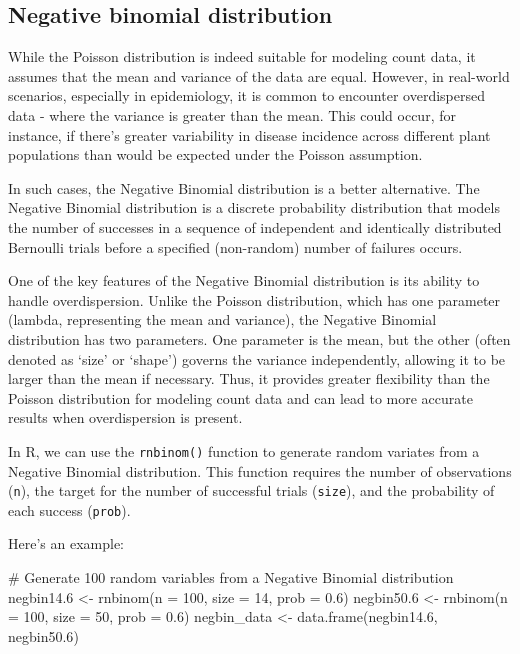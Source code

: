 \documentclass[
  letterpaper,
  DIV=11,
  numbers=noendperiod]{scrreprt}
\newenvironment{Shaded}{\begin{snugshade}}{\end{snugshade}}
\newcommand{\AttributeTok}[1]{\textcolor[rgb]{0.40,0.45,0.13}{#1}}
\newcommand{\CommentTok}[1]{\textcolor[rgb]{0.37,0.37,0.37}{#1}}
\newcommand{\DecValTok}[1]{\textcolor[rgb]{0.68,0.00,0.00}{#1}}
\newcommand{\FloatTok}[1]{\textcolor[rgb]{0.68,0.00,0.00}{#1}}
\newcommand{\FunctionTok}[1]{\textcolor[rgb]{0.28,0.35,0.67}{#1}}
\newcommand{\NormalTok}[1]{\textcolor[rgb]{0.00,0.23,0.31}{#1}}
\newcommand{\OtherTok}[1]{\textcolor[rgb]{0.00,0.23,0.31}{#1}}
\begin{document}
\hypertarget{negative-binomial-distribution}{%
\subsection{Negative binomial
distribution}\label{negative-binomial-distribution}}

While the Poisson distribution is indeed suitable for modeling count
data, it assumes that the mean and variance of the data are equal.
However, in real-world scenarios, especially in epidemiology, it is
common to encounter overdispersed data - where the variance is greater
than the mean. This could occur, for instance, if there's greater
variability in disease incidence across different plant populations than
would be expected under the Poisson assumption.

In such cases, the Negative Binomial distribution is a better
alternative. The Negative Binomial distribution is a discrete
probability distribution that models the number of successes in a
sequence of independent and identically distributed Bernoulli trials
before a specified (non-random) number of failures occurs.

One of the key features of the Negative Binomial distribution is its
ability to handle overdispersion. Unlike the Poisson distribution, which
has one parameter (lambda, representing the mean and variance), the
Negative Binomial distribution has two parameters. One parameter is the
mean, but the other (often denoted as `size' or `shape') governs the
variance independently, allowing it to be larger than the mean if
necessary. Thus, it provides greater flexibility than the Poisson
distribution for modeling count data and can lead to more accurate
results when overdispersion is present.

In R, we can use the \texttt{rnbinom()} function to generate random
variates from a Negative Binomial distribution. This function requires
the number of observations (\texttt{n}), the target for the number of
successful trials (\texttt{size}), and the probability of each success
(\texttt{prob}).

Here's an example:

\begin{Shaded}
\begin{Highlighting}[]
\CommentTok{\# Generate 100 random variables from a Negative Binomial distribution}
\NormalTok{negbin14}\FloatTok{.6} \OtherTok{\textless{}{-}} \FunctionTok{rnbinom}\NormalTok{(}\AttributeTok{n =} \DecValTok{100}\NormalTok{, }\AttributeTok{size =} \DecValTok{14}\NormalTok{, }\AttributeTok{prob =} \FloatTok{0.6}\NormalTok{)}
\NormalTok{negbin50}\FloatTok{.6} \OtherTok{\textless{}{-}} \FunctionTok{rnbinom}\NormalTok{(}\AttributeTok{n =} \DecValTok{100}\NormalTok{, }\AttributeTok{size =} \DecValTok{50}\NormalTok{, }\AttributeTok{prob =} \FloatTok{0.6}\NormalTok{)}
\NormalTok{negbin\_data }\OtherTok{\textless{}{-}} \FunctionTok{data.frame}\NormalTok{(negbin14}\FloatTok{.6}\NormalTok{, negbin50}\FloatTok{.6}\NormalTok{)}
\end{Highlighting}
\end{Shaded}
\end{document}
